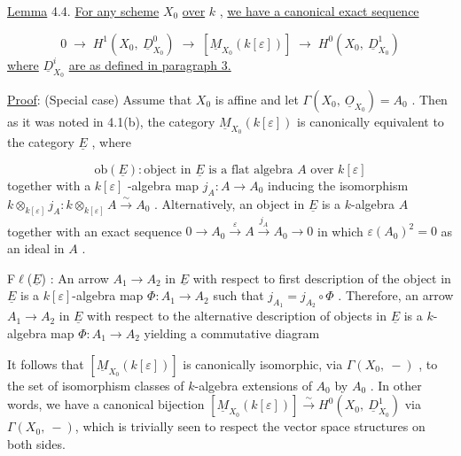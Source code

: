 \underline{Lemma} 4.4.  \underline{For any scheme} $X_0$ \underline{over} $k$ , \underline{we have a canonical exact sequence}

\begin{equation*}
0 \;\to\; H^{1}(X_{0},\ \underline{D}^{0}_{X_{0}}) \;\to\; [\underline{M}_{X_{0}}(k[\varepsilon])] \;\to\; H^{0}(X_{0},\ \underline{D}^{1}_{X_{0}})
\end{equation*}
\underline{where} $\underline{D}^{i}_{X_{0}}$ \underline{are as defined in paragraph 3.}

\underline{Proof}:  (Special case)  Assume that $X_{0}$ is affine and let $\Gamma(X_{0},\ \underline{O}_{X_{0}}) = A_{0}$ . Then as it was noted in 4.1(b), the category $\underline{M}_{X_{0}}(k[\varepsilon])$ is canonically equivalent to the category $\underline{E}$ , where

\begin{equation*}
\mathrm{ob}(\underline{E}) : \text{object in } \underline{E} \text{ is a flat algebra } A \text{ over } k[\varepsilon]
\end{equation*}
together with a  $k[\varepsilon]$ -algebra map  $j_{A} : A \to A_{0}$  inducing the isomorphism $k \otimes_{k[\varepsilon]} j_{A} : k \otimes_{k[\varepsilon]} A \overset{\sim}{\longrightarrow} A_{0}$ . Alternatively, an object in $\underline{E}$ is a $k$-algebra $A$  together with an exact sequence  $0 \to A_{0} \overset{\varepsilon}{\longrightarrow} A \overset{j_{A}}{\longrightarrow} A_{0} \to 0$  in which $\varepsilon(A_{0})^{2} = 0$  as an ideal in  $A$ .

F$\ell$($\underline{E}$) :  An arrow  $A_{1} \to A_{2}$  in  $\underline{E}$  with respect to first description of the object in  $\underline{E}$  is a  $k[\varepsilon]$-algebra map  $\Phi : A_{1} \to A_{2}$  such that  $j_{A_{1}} = j_{A_{2}} \circ \Phi$ . Therefore, an arrow  $A_{1} \to A_{2}$  in  $\underline{E}$  with respect to the alternative description of objects in  $\underline{E}$  is a $k$-algebra map  $\Phi : A_{1} \to A_{2}$  yielding a commutative diagram

\begin{center}
\end{center}
It follows that  $[\underline{M}_{X_{0}}(k[\varepsilon])]$  is canonically isomorphic, via  $\Gamma(X_{0},\ -)$ , to the set of isomorphism classes of $k$-algebra extensions of  $A_{0}$  by  $A_{0}$ . In other words, we have a canonical bijection  $[\underline{M}_{X_{0}}(k[\varepsilon])] \overset{\sim}{\longrightarrow} H^{0}(X_{0},\ \underline{D}^{1}_{X_{0}})$  via $\Gamma(X_{0},\ -)$, which is trivially seen to respect the vector space structures on both sides.



